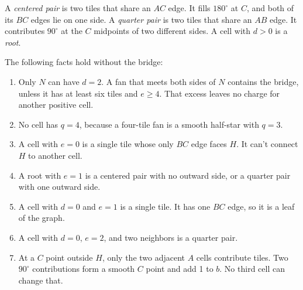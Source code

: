 \documentclass[11pt]{article}
\theoremstyle{remark}
\begin{document}
A \emph{centered pair} is two tiles that share an $AC$ edge. It fills $180^\circ$ at $C$, and both of its $BC$ edges lie on one side. A \emph{quarter pair} is two tiles that share an $AB$ edge. It contributes $90^\circ$ at the $C$ midpoints of two different sides. A cell with $d>0$ is a \emph{root}.

The following facts hold without the bridge:
\begin{enumerate}[label=(F\arabic*)]
\item Only $N$ can have $d=2$. A fan that meets both sides of $N$ contains the bridge, unless it has at least six tiles and $e\ge4$. That excess leaves no charge for another positive cell.
\item No cell has $q=4$, because a four-tile fan is a smooth half-star with $q=3$.
\item A cell with $e=0$ is a single tile whose only $BC$ edge faces $H$. It can't connect $H$ to another cell.
\item A root with $e=1$ is a centered pair with no outward side, or a quarter pair with one outward side.
\item A cell with $d=0$ and $e=1$ is a single tile. It has one $BC$ edge, so it is a leaf of the graph.
\item A cell with $d=0$, $e=2$, and two neighbors is a quarter pair.
\item At a $C$ point outside $H$, only the two adjacent $A$ cells contribute tiles. Two $90^\circ$ contributions form a smooth $C$ point and add 1 to $b$. No third cell can change that.
\end{enumerate}
\end{document}
